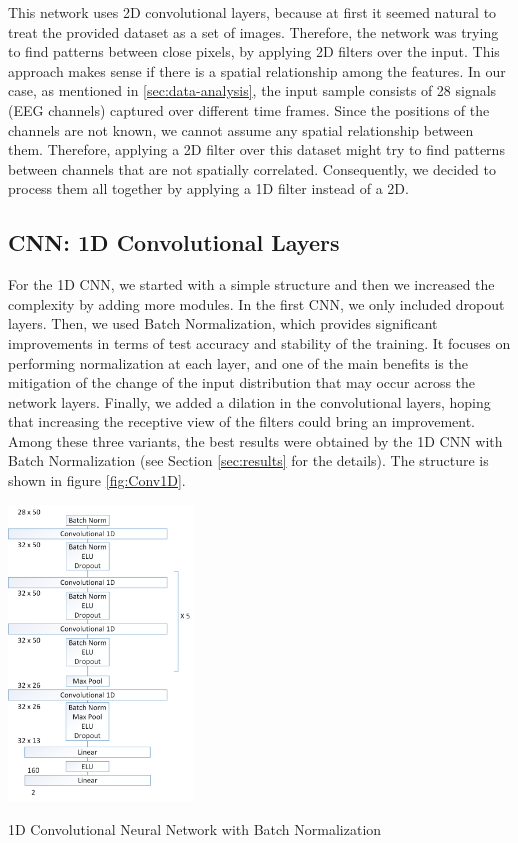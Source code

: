 \documentclass[10pt,conference,compsocconf]{IEEEtran}
\begin{document}
This network uses 2D convolutional layers, because at first it seemed natural to treat the provided dataset as a set of images. Therefore, the network was trying to find patterns between close pixels, by applying 2D filters over the input. This approach makes sense if there is a spatial relationship among the features. In our case, as mentioned in \ref{sec:data-analysis}, the input sample consists of 28 signals (EEG channels) captured over different time frames. Since the positions of the channels are not known, we cannot assume any spatial relationship between them. Therefore, applying a 2D filter over this dataset might try to find patterns between channels that are not spatially correlated. Consequently, we decided to process them all together by applying a 1D filter instead of a 2D. 


\subsection{CNN: 1D Convolutional Layers}
For the 1D CNN, we started with a simple structure and then we increased the complexity by adding more modules. In the first CNN, we only included dropout layers. Then, we used Batch Normalization, which provides significant improvements in terms of test accuracy and stability of the training. It focuses on performing normalization at each layer, and one of the main benefits is the mitigation of the change of the input distribution that may occur across the network layers. Finally, we added a dilation in the convolutional layers, hoping that increasing the receptive view of the filters could bring an improvement. Among these three variants, the best results were obtained by the 1D CNN with Batch Normalization (see Section \ref{sec:results} for the details). The structure is shown in figure \ref{fig:Conv1D}.

\begin{center}
	\captionsetup{type=figure}
	\includegraphics[width=0.37\textwidth]{img/Conv1DBatchNorm.png}
	\caption {1D Convolutional Neural Network with Batch Normalization}
	\label{fig:Conv1D}
\end{center}
\end{document}
